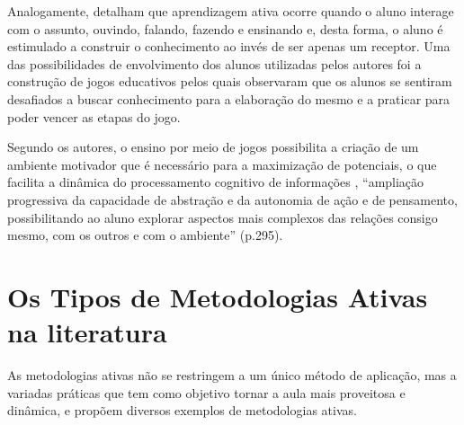 Analogamente,  detalham que aprendizagem ativa ocorre quando o aluno interage com o assunto, ouvindo, falando, fazendo e ensinando e, desta forma, o aluno é estimulado a construir o conhecimento ao invés de ser apenas um receptor. Uma das possibilidades de envolvimento dos alunos utilizadas pelos autores foi a construção de jogos educativos pelos quais observaram que os alunos se sentiram desafiados a buscar conhecimento para a elaboração do mesmo e a praticar para poder vencer as etapas do jogo.

Segundo os autores, o ensino por meio de jogos possibilita a criação de um ambiente motivador que é necessário para a maximização de potenciais, o que facilita a dinâmica do processamento cognitivo de informações  \cite{CARVALHO2021}, ``ampliação progressiva da capacidade de abstração e da autonomia de ação e de pensamento, possibilitando ao aluno explorar aspectos mais complexos das relações consigo mesmo, com os outros e com o ambiente'' \cite{Educacao.SecretariadeEducacaoFundamental2017}  (p.295).

\section{Os Tipos de Metodologias Ativas na literatura}

As metodologias ativas não se restringem a um único método de aplicação, mas a variadas práticas que tem como objetivo tornar a aula mais proveitosa e dinâmica, e  propõem diversos exemplos de metodologias ativas.

